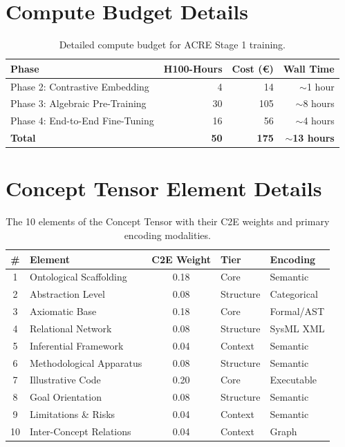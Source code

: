 \documentclass{article}
\begin{document}
\section{Compute Budget Details}

\begin{table}[h]
\centering
\caption{Detailed compute budget for ACRE Stage 1 training.}
\begin{tabular}{lrrr}
\toprule
\textbf{Phase} & \textbf{H100-Hours} & \textbf{Cost (\euro)} & \textbf{Wall Time} \\
\midrule
Phase 2: Contrastive Embedding & 4 & 14 & $\sim$1 hour \\
Phase 3: Algebraic Pre-Training & 30 & 105 & $\sim$8 hours \\
Phase 4: End-to-End Fine-Tuning & 16 & 56 & $\sim$4 hours \\
\midrule
\textbf{Total} & \textbf{50} & \textbf{175} & \textbf{$\sim$13 hours} \\
\bottomrule
\end{tabular}
\end{table}

\section{Concept Tensor Element Details}

\begin{table}[h]
\centering
\caption{The 10 elements of the Concept Tensor with their C2E weights and primary encoding modalities.}
\begin{tabular}{clcll}
\toprule
\textbf{\#} & \textbf{Element} & \textbf{C2E Weight} & \textbf{Tier} & \textbf{Encoding} \\
\midrule
1 & Ontological Scaffolding & 0.18 & Core & Semantic \\
2 & Abstraction Level & 0.08 & Structure & Categorical \\
3 & Axiomatic Base & 0.18 & Core & Formal/AST \\
4 & Relational Network & 0.08 & Structure & SysML XML \\
5 & Inferential Framework & 0.04 & Context & Semantic \\
6 & Methodological Apparatus & 0.08 & Structure & Semantic \\
7 & Illustrative Code & 0.20 & Core & Executable \\
8 & Goal Orientation & 0.08 & Structure & Semantic \\
9 & Limitations \& Risks & 0.04 & Context & Semantic \\
10 & Inter-Concept Relations & 0.04 & Context & Graph \\
\bottomrule
\end{tabular}
\end{table}
\end{document}
